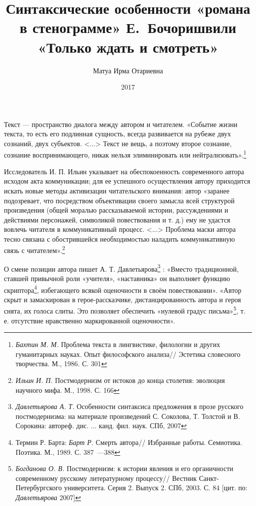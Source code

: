 \documentclass{kursa4}
\title{Синтаксические особенности «романа в стенограмме» Е.~Бочоришвили «Только ждать и смотреть»}
\author{Матуа Ирма Отариевна}
\date{2017}
\begin{document}
  
  \maketitle

  \tableofcontents


    \setcounter{page}{3}
    \pagestyle{plain}
    
    Текст — пространство диалога между автором и читателем. «Событие жизни текста, то есть его подлинная сущность, всегда развивается на рубеже двух сознаний, двух субъектов. <...> Текст не вещь, а поэтому второе сознание, сознание воспринимающего, никак нельзя элиминировать или нейтрализовать».\footnote{\textit{Бахтин М. М.} Проблема текста в лингвистике, филологии и других гуманитарных науках. Опыт философского анализа// Эстетика словесного творчества. М., 1986. С. 301} 

    Исследователь И. П. Ильин указывает на обеспокоенность современного автора исходом акта коммуникации; для ее успешного осуществления автору приходится искать новые методы активизации читательского внимания: автор «заранее подозревает, что посредством объективации своего замысла всей структурой произведения (общей моралью рассказываемой истории, рассуждениями и действиями персонажей, символикой повествования и т. д.) ему не удастся вовлечь читателя в коммуникативный процесс. <...> Проблема маски автора тесно связана с обострившейся необходимостью наладить коммуникативную связь с читателем».\footnote{\textit{Ильин И. П.} Постмодернизм от истоков до конца столетия: эволюция научного мифа. М., 1998. С. 166} 

    О смене позиции автора пишет А. Т. Давлетьярова\footnote{\textit{Давлетьярова А. Т.} Особенности синтаксиса предложения в прозе русского постмодернизма: на материале произведений С. Соколова, Т. Толстой и В. Сорокина: автореф. дис. ... канд. фил. наук. СПб, 2007} : «Вместо традиционной, ставшей привычной роли «учителя», «наставника» он выполняет функцию скриптора\footnote{Термин Р. Барта: \textit{Барт Р.} Смерть автора// Избранные работы. Семиотика. Поэтика. М., 1989. С. 387~---388}, избегающего всякой оценочности в своём повествовании». «Автор скрыт и замаскирован в герое-рассказчике, дистанцированность автора и героя снята, их голоса слиты. Это позволяет обеспечить «нулевой градус письма»\footnote{\textit{Богданова О. В.} Постмодернизм: к истории явления и его органичности современному русскому литературному процессу// Вестник Санкт-Петербургского университета. Серия 2. Выпуск 2. СПб, 2003. С. 84 [цит. по: \textit{Давлетьярова} 2007]}, т. е. отсутствие нравственно маркированной оценочности».
\end{document}
